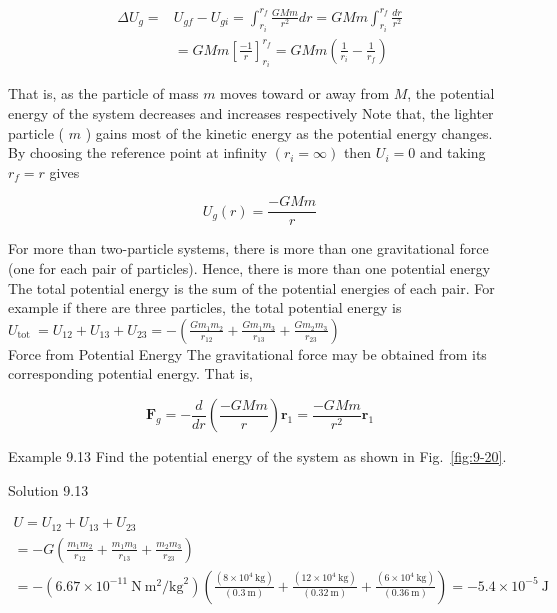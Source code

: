\documentclass[10pt]{article}
\numberwithin{equation}{section}
\begin{document}
$$
\begin{aligned}
\Delta U_{g}= & U_{g f}-U_{g i}=\int_{r_{i}}^{r_{f}} \frac{G M m}{r^{2}} d r=G M m \int_{r_{i}}^{r_{f}} \frac{d r}{r^{2}} \\
& =G M m\left[\frac{-1}{r}\right]_{r_{i}}^{r_{f}}=G M m\left(\frac{1}{r_{i}}-\frac{1}{r_{f}}\right)
\end{aligned}
$$

That is, as the particle of mass $m$ moves toward or away from $M$, the potential energy of the system decreases and increases respectively Note that, the lighter particle ( $m$ ) gains most of the kinetic energy as the potential energy changes. By choosing the reference point at infinity $\left(r_{i}=\infty\right)$ then $U_{i}=0$ and taking $r_{f}=r$ gives

$$
U_{g}(r)=\frac{-G M m}{r}
$$

For more than two-particle systems, there is more than one gravitational force (one for each pair of particles). Hence, there is more than one potential energy The total potential energy is the sum of the potential energies of each pair. For example if there are three particles, the total potential energy is\\
$U_{\text {tot }}=U_{12}+U_{13}+U_{23}=-\left(\frac{G m_{1} m_{2}}{r_{12}}+\frac{G m_{1} m_{3}}{r_{13}}+\frac{G m_{2} m_{3}}{r_{23}}\right)$\\
Force from Potential Energy The gravitational force may be obtained from its corresponding potential energy. That is,

$$
\mathbf{F}_{g}=-\frac{d}{d r}\left(\frac{-G M m}{r}\right) \mathbf{r}_{1}=\frac{-G M m}{r^{2}} \mathbf{r}_{1}
$$

Example 9.13 Find the potential energy of the system as shown in Fig.~\ref{fig:9-20}.

Solution 9.13

$$
\begin{gathered}
U=U_{12}+U_{13}+U_{23} \\
=-G\left(\frac{m_{1} m_{2}}{r_{12}}+\frac{m_{1} m_{3}}{r_{13}}+\frac{m_{2} m_{3}}{r_{23}}\right) \\
=-\left(6.67 \times 10^{-11} \mathrm{~N} \mathrm{~m}^{2} / \mathrm{kg}^{2}\right)\left(\frac{\left(8 \times 10^{4} \mathrm{~kg}\right)}{(0.3 \mathrm{~m})}+\frac{\left(12 \times 10^{4} \mathrm{~kg}\right)}{(0.32 \mathrm{~m})}+\frac{\left(6 \times 10^{4} \mathrm{~kg}\right)}{(0.36 \mathrm{~m})}\right)=-5.4 \times 10^{-5} \mathrm{~J}
\end{gathered}
$$
\end{document}
